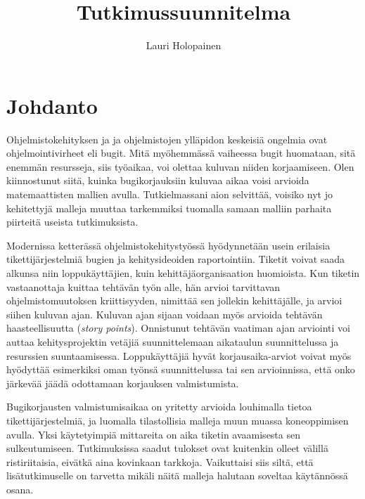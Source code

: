 \documentclass[utf8]{gradu3}
\begin{document}
\title{Tutkimussuunnitelma}

\author{Lauri Holopainen}


\maketitle

\mainmatter

\chapter{Johdanto}
Ohjelmistokehityksen ja  ja ohjelmistojen ylläpidon keskeisiä ongelmia ovat
ohjelmointivirheet eli bugit. Mitä myöhemmässä vaiheessa bugit huomataan, sitä
enemmän resursseja, siis työaikaa, voi olettaa kuluvan niiden korjaamiseen. Olen
kiinnostunut siitä, kuinka bugikorjauksiin kuluvaa aikaa voisi arvioida
matemaattisten mallien avulla. Tutkielmassani aion selvittää, voisiko nyt jo
kehitettyjä malleja muuttaa tarkemmiksi tuomalla samaan malliin parhaita
piirteitä useista tutkimuksista.

Modernissa ketterässä ohjelmistokehitystyössä hyödynnetään usein erilaisia
tikettijärjestelmiä bugien ja kehitysideoiden raportointiin. Tiketit voivat
saada alkunsa niin loppukäyttäjien, kuin kehittäjäorganisaation huomioista. Kun
tiketin vastaanottaja kuittaa tehtävän työn alle, hän arvioi tarvittavan
ohjelmistomuutoksen kriittisyyden, nimittää sen jollekin kehittäjälle, ja arvioi
siihen kuluvan ajan. Kuluvan ajan sijaan voidaan myös arvioida tehtävän
haasteellisuutta (\textit{story points}). Onnistunut tehtävän vaatiman ajan
arviointi voi auttaa kehitysprojektin vetäjiä suunnittelemaan aikataulun
suunnittelussa ja resurssien suuntaamisessa. Loppukäyttäjiä hyvät
korjausaika-arviot voivat myös hyödyttää esimerkiksi oman työnsä suunnittelussa
tai sen arvioinnissa, että onko järkevää jäädä odottamaan korjauksen
valmistumista.

Bugikorjausten valmistumisaikaa on yritetty arvioida louhimalla tietoa
tikettijärjestelmiä, ja luomalla tilastollisia malleja muun muassa koneoppimisen
avulla. Yksi käytetyimpiä mittareita on aika tiketin avaamisesta sen
sulkeutumiseen. Tutkimuksissa saadut tulokset ovat kuitenkin olleet välillä
ristiriitaisia, eivätkä aina kovinkaan tarkkoja. Vaikuttaisi siis siltä, että
lisätutkimuselle on tarvetta mikäli näitä malleja halutaan soveltaa käytännössä
osana.
\end{document}
